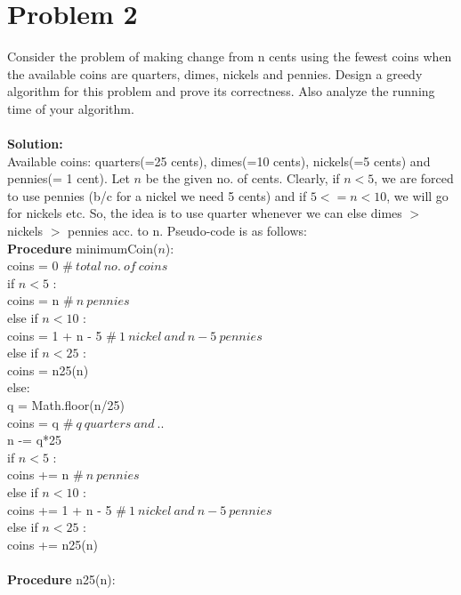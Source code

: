 \documentclass{article}
\newcommand\tab[1][4mm]{\hspace*{#1}}
\begin{document}
\section*{Problem 2}
Consider the problem of making change from n cents using the fewest coins when the available coins are quarters, dimes, nickels and pennies. Design a greedy algorithm for this problem and prove its correctness. Also analyze the running time of your algorithm. \\
\vspace{1mm} \\
\textbf{Solution:} \\
Available coins: quarters(=25 cents), dimes(=10 cents), nickels(=5 cents) and pennies(= 1 cent). Let $n$ be the given no. of cents. Clearly, if $n < 5$, we are forced to use pennies (b/c for a nickel we need 5 cents) and if $5 <= n < 10$, we will go for nickels etc. So, the idea is to use quarter whenever we can else dimes $>$ nickels $>$ pennies acc. to n. Pseudo-code is as follows: \\
\textbf{Procedure} minimumCoin($n$):\\
\tab coins = 0 $\#\ total\ no.\ of\ coins$ \\
\tab if $n < 5$ : \\
\tab\tab  coins = n $\#\ n\ pennies $\\ 
\tab else if $n < 10$ : \\
\tab\tab coins = 1 + n - 5 $\#\ 1\ nickel\ and\ n - 5\ pennies $\\ 
\tab else if $n < 25$ : \\
\tab\tab coins = n25(n) \\
\tab else: \\
\tab\tab q = Math.floor(n/25) \\
\tab\tab coins = q  $\#\ q\ quarters\ and\ ..$\\ 
\tab\tab n -= q*25 \\
\tab\tab if $n < 5$ : \\
\tab\tab\tab  coins += n $\#\ n\ pennies $\\ 
\tab\tab else if $n < 10$ : \\
\tab\tab\tab coins += 1 + n - 5 $\#\ 1\ nickel\ and\ n - 5\ pennies $\\ 
\tab\tab else if $n < 25$ : \\
\tab\tab\tab coins += n25(n) \\
\vspace{0.5mm} \\
\textbf{Procedure} n25(n): \\
\end{document}
